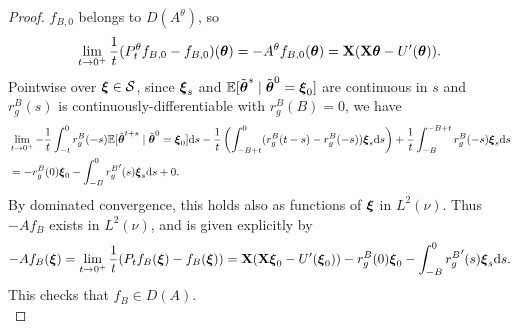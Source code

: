 \begin{proof}
$f_{B,0}$ belongs to $D(A^\theta)$, so
\[\lim_{t \to 0^+} \frac{1}{t}(P_t^\theta f_{B,0}-f_{B,0})(\boldsymbol{\theta})
={-}A^\theta f_{B,0}(\boldsymbol{\theta})=\mathbf{X}(\mathbf{X}\boldsymbol{\theta}-U'(\boldsymbol{\theta})).\]
Pointwise over $\boldsymbol{\xi} \in \mathcal{S}$, since $\boldsymbol{\xi}_s$ and
$\mathbb{E}[\tilde {\boldsymbol{\theta}}^s \mid \tilde {\boldsymbol{\theta}}^0=\boldsymbol{\xi}_0]$ are
continuous in $s$ and $r_g^B(s)$ is continuously-differentiable with
$r_g^B(B)=0$, we have
\begin{align*}
&\lim_{t \to 0^+}
{-}\frac{1}{t}\int_{-t}^0 r_g^B({-}s)\mathbb{E}[\tilde {\boldsymbol{\theta}}^{t+s} \mid \tilde {\boldsymbol{\theta}}^0=\boldsymbol{\xi}_0]\mathrm{d} s
-\frac{1}{t}\left(\int_{-B+t}^0 (r_g^B(t-s)-r_g^B({-}s))\boldsymbol{\xi}_s\mathrm{d} s\right)
+\frac{1}{t}\int_{-B}^{-B+t} r_g^B({-}s)\boldsymbol{\xi}_s \mathrm{d} s\\
&={-}r_g^B(0)\boldsymbol{\xi}_0-\int_{-B}^0 {r_g^B}'(s)\boldsymbol{\xi}_s \mathrm{d} s+0.
\end{align*}
By dominated convergence, this holds also as functions of $\boldsymbol{\xi}$ in
$L^2(\nu)$. Thus ${-}Af_B$ exists in $L^2(\nu)$, and is given explicitly by
\begin{equation}\label{eq:generatorformula}
-Af_B(\boldsymbol{\xi})
=\lim_{t \to 0^+} \frac{1}{t}(P_tf_B(\boldsymbol{\xi})-f_B(\boldsymbol{\xi}))
=\mathbf{X}(\mathbf{X}\boldsymbol{\xi}_0-U'(\boldsymbol{\xi}_0))-r_g^B(0)\boldsymbol{\xi}_0-\int_{-B}^0 {r_g^B}'(s)\boldsymbol{\xi}_s \mathrm{d} s.
\end{equation}
This checks that $f_B \in D(A)$.\\


\end{proof}
